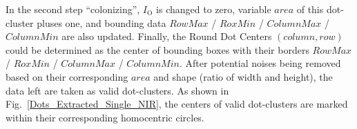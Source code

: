 %
In the second step \enquote{colonizing},  \(I_{\text{O}}\) is changed to zero, variable \(area\) of this dot-cluster pluses one, and bounding data \(RowMax\) / \(RoxMin\) / \(ColumnMax\) / \(ColumnMin\) are also updated.%
%
Finally, the Round Dot Centers \((column, row)\) could be determined as the center of bounding boxes with their borders \(RowMax\) / \(RoxMin\) / \(ColumnMax\) / \(ColumnMin\). After potential noises being removed based on their corresponding \(area\) and shape (ratio of width and height), the data left are taken as valid dot-clusters. As shown in Fig.~\ref{Dots_Extracted_Single_NIR}, the centers of valid dot-clusters are marked within their corresponding homocentric circles.
\\\\%
%
